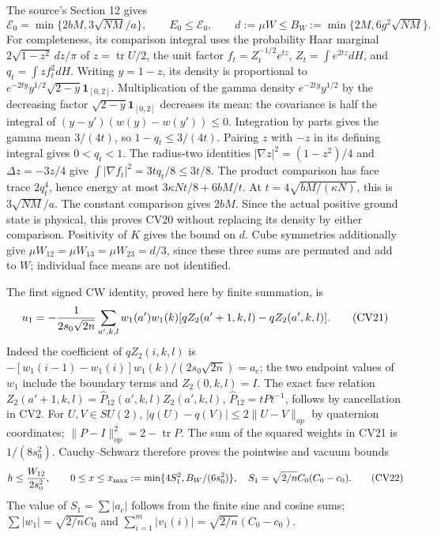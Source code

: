 \documentclass[11pt]{article}
\begin{document}
The source's Section 12 gives
\[
 \mathcal E_0=\min\{2bM,3\sqrt{NM}/a\},\qquad
 E_0\le\mathcal E_0,\qquad
 d:=\mu W\le B_W:=\min\{2M,6g^2\sqrt{NM}\}.             \tag{CV20}
\]
For completeness, its comparison integral uses the probability Haar
marginal \(2\sqrt{1-z^2}\,dz/\pi\) of \(z=\operatorname{tr}U/2\),
the unit factor \(f_t=Z_t^{-1/2}e^{tz}\),
\(Z_t=\int e^{2tz}dH\), and \(q_t=\int zf_t^2dH\).
Writing \(y=1-z\), its density is proportional to
\(e^{-2ty}y^{1/2}\sqrt{2-y}\mathbf1_{[0,2]}\).
Multiplication of the gamma density \(e^{-2ty}y^{1/2}\) by the
decreasing factor \(\sqrt{2-y}\mathbf1_{[0,2]}\) decreases its mean:
the covariance is half the integral of
\((y-y')(w(y)-w(y'))\le0\). Integration by parts gives the gamma
mean \(3/(4t)\), so \(1-q_t\le3/(4t)\).
Pairing \(z\) with \(-z\) in its defining integral gives \(0<q_t<1\).
The radius-two identities \(|\nabla z|^2=(1-z^2)/4\) and
\(\Delta z=-3z/4\) give
\(\int|\nabla f_t|^2=3tq_t/8\le3t/8\).
The product comparison has face trace \(2q_t^4\), hence energy at most
\(3\kappa Nt/8+6bM/t\). At
\(t=4\sqrt{bM/(\kappa N)}\), this is \(3\sqrt{NM}/a\).
The constant comparison gives \(2bM\). Since the actual positive
ground state is physical, this proves CV20 without replacing its
density by either comparison. Positivity of \(K\) gives the bound on
\(d\). Cube symmetries additionally give
\(\mu W_{12}=\mu W_{13}=\mu W_{23}=d/3\), since these three sums
are permuted and add to \(W\); individual face means are not identified.

The first signed CW identity, proved here by finite summation, is
\[
 u_1=-{1\over2s_0\sqrt{2n}}
  \sum_{a',k,l}w_1(a')w_1(k)
        [qZ_2(a'+1,k,l)-qZ_2(a',k,l)].                  \tag{CV21}
\]
Indeed the coefficient of \(qZ_2(i,k,l)\) is
\(-[w_1(i-1)-w_1(i)]w_1(k)/(2s_0\sqrt{2n})=a_c\);
the two endpoint values of \(w_1\) include the boundary terms and
\(Z_2(0,k,l)=I\). The exact face relation
\(Z_2(a'+1,k,l)=\widehat P_{12}(a',k,l)Z_2(a',k,l)\),
\(\widehat P_{12}=tPt^{-1}\), follows by cancellation in CV2.
For \(U,V\in SU(2)\), \(|q(U)-q(V)|\le2\|U-V\|_{op}\)
by quaternion coordinates; \(\|P-I\|_{op}^2=2-\operatorname{tr}P\).
The sum of the squared weights in CV21 is \(1/(8s_0^2)\).
Cauchy--Schwarz therefore proves the pointwise and vacuum bounds
\[
 h\le{W_{12}\over2s_0^2},\qquad
 0\le x\le x_{\max}:=\min\{4S_1^2,B_W/(6s_0^2)\},
 \quad S_1=\sqrt{2/n}C_0(C_0-c_0).                       \tag{CV22}
\]
The value of \(S_1=\sum|a_c|\) follows from the finite sine and cosine
sums; \(\sum|w_1|=\sqrt{2/n}C_0\) and
\(\sum_{i=1}^m|v_1(i)|=\sqrt{2/n}(C_0-c_0)\).
\end{document}
